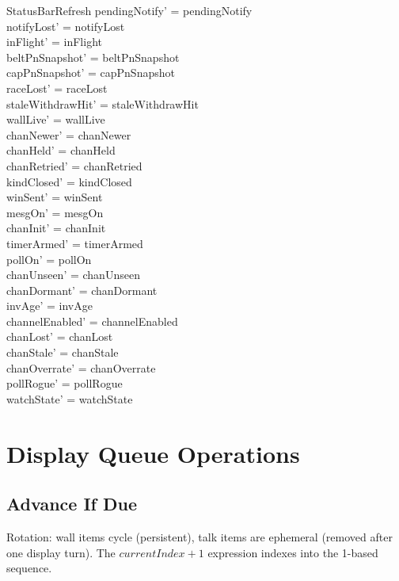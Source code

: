 \documentclass[a4paper,10pt,fleqn]{article}
\begin{document}
\begin{schema}{StatusBarRefresh}
  pendingNotify' = pendingNotify \\
  notifyLost' = notifyLost \\
  inFlight' = inFlight \\
  beltPnSnapshot' = beltPnSnapshot \\
  capPnSnapshot' = capPnSnapshot \\
  raceLost' = raceLost \\
  staleWithdrawHit' = staleWithdrawHit \\
  wallLive' = wallLive \\
  chanNewer' = chanNewer \\
  chanHeld' = chanHeld \\
  chanRetried' = chanRetried \\
  kindClosed' = kindClosed \\
  winSent' = winSent \\
  mesgOn' = mesgOn \\
  chanInit' = chanInit \\
  timerArmed' = timerArmed \\
  pollOn' = pollOn \\
  chanUnseen' = chanUnseen \\
  chanDormant' = chanDormant \\
  invAge' = invAge \\
  channelEnabled' = channelEnabled \\
  chanLost' = chanLost \\
  chanStale' = chanStale \\
  chanOverrate' = chanOverrate \\
  pollRogue' = pollRogue \\
  watchState' = watchState
\end{schema}

\section{Display Queue Operations}

\subsection{Advance If Due}

Rotation: wall items cycle (persistent), talk items are
ephemeral (removed after one display turn).  The $currentIndex + 1$
expression indexes into the 1-based sequence.
\end{document}
